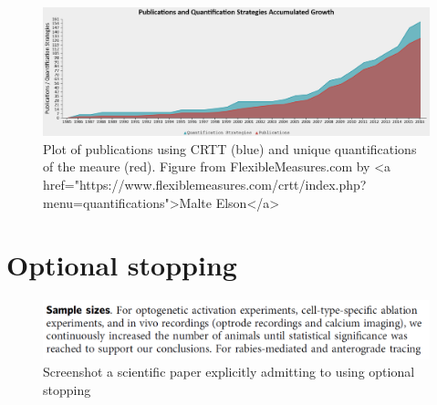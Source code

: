 \documentclass[
]{krantz}
\begin{document}
\begin{figure}

{\centering \includegraphics[width=1\linewidth]{images/flexiblemeasure} 

}

\caption{Plot of publications using CRTT (blue) and unique quantifications of the meaure (red). Figure from FlexibleMeasures.com by <a href="https://www.flexiblemeasures.com/crtt/index.php?menu=quantifications">Malte Elson</a>}\label{fig:flexiblemeasure}
\end{figure}

\hypertarget{optional-stopping}{%
\section{Optional stopping}\label{optional-stopping}}

\begin{figure}

{\centering \includegraphics[width=1\linewidth]{images/optionalstoppingexample} 

}

\caption{Screenshot a scientific paper explicitly admitting to using optional stopping}\label{fig:optionalstoppingexample}
\end{figure}
\end{document}
